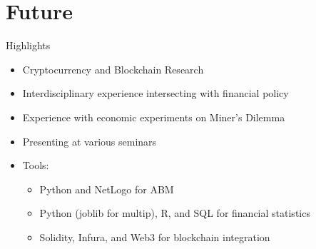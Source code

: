 \documentclass{beamer}
\begin{document}
\section{Future}

\begin{frame}{Highlights}
\begin{itemize}
\item Cryptocurrency and Blockchain Research
\item Interdisciplinary experience intersecting with financial policy
\item Experience with economic experiments on Miner's Dilemma
\item Presenting at various seminars
\item Tools: 
\begin{itemize}
    \item Python and NetLogo for ABM
    \item Python (joblib for multip), R, and SQL for financial statistics
    \item Solidity, Infura, and Web3 for blockchain integration
\end{itemize}
\end{itemize}
\end{frame}



\end{document}
